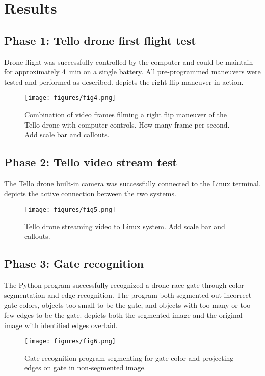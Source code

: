 \section{Results}

\subsection{Phase 1: Tello drone first flight test}
Drone flight was successfully controlled by the computer and could be maintain for approximately \SI{4}{\minute} on a single battery. All pre-programmed maneuvers were tested and performed as described.  depicts the right flip maneuver in action.
\begin{figure}
\begin{center}
\texttt{[image: figures/fig4.png]}
\end{center}
\caption{Combination of video frames filming a right flip maneuver of the Tello drone with computer controls. How many frame per second. Add scale bar and callouts.}
\label{fig:4}
\end{figure}

\subsection{Phase 2: Tello video stream test}
The Tello drone built-in camera was successfully connected to the Linux terminal.  depicts the active connection between the two systems. 
\begin{figure}
\begin{center}
\texttt{[image: figures/fig5.png]}
\end{center}
\caption{Tello drone streaming video to Linux system. Add scale bar and callouts.}
\label{fig:5}
\end{figure}

\subsection{Phase 3: Gate recognition}
The Python program successfully recognized a drone race gate through color segmentation and edge recognition. The program both segmented out incorrect gate colors, objects too small to be the gate, and objects with too many or too few edges to be the gate.  depicts both the segmented image and the original image with identified edges overlaid.
\begin{figure}
\begin{center}
\texttt{[image: figures/fig6.png]}
\end{center}
\caption{Gate recognition program segmenting for gate color and projecting edges on gate in non-segmented image.}
\label{fig:6}
\end{figure}

